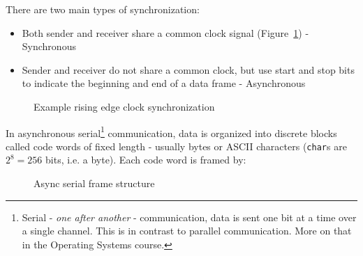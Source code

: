 There are two main types of synchronization:
\begin{itemize}
    \item Both sender and receiver share a common clock signal (Figure~\ref{fig:clock_sync}) - Synchronous 
    \item Sender and receiver do not share a common clock, but use start and stop bits to indicate the beginning and end of a data frame - Asynchronous
\end{itemize}

\begin{figure}[h]
    \centering
    \caption{Example rising edge clock synchronization}\label{fig:clock_sync}
\end{figure}

\vfill
In asynchronous serial\footnote{
    Serial - \textit{one after another} - communication, data is sent one bit at a time over a single channel. This is in contrast to parallel communication. More on that in the Operating Systems course.
} communication, data is organized into discrete blocks called code words of fixed length - usually bytes or ASCII characters (\texttt{char}s are $2^8 = 256$ bits, i.e. a byte). Each code word is framed by:

\begin{figure}[h]
    \centering
    
    \caption{Async serial frame structure}\label{fig:async_frame}
\end{figure}


